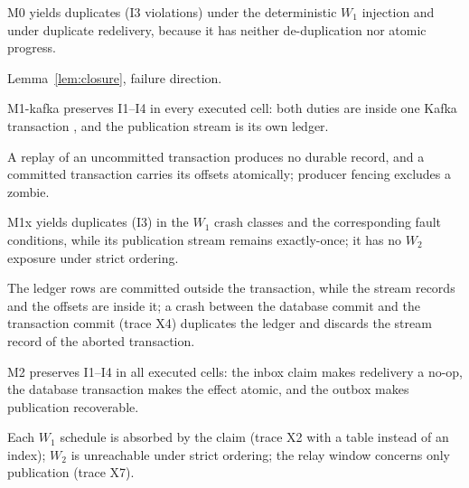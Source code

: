 \begin{proposition}
\label{prop:p4}
M0 yields duplicates (I3 violations) under the deterministic $W_1$ injection and under duplicate
redelivery, because it has neither de-duplication nor atomic progress.
\end{proposition}
\begin{proofsketch}
Lemma~\ref{lem:closure}, failure direction.
\end{proofsketch}

\begin{proposition}
\label{prop:p5}
M1-kafka preserves I1--I4 in every executed cell: both duties are inside one Kafka transaction
\cite{kip98}, and the publication stream is its own ledger.
\end{proposition}
\begin{proofsketch}
A replay of an uncommitted transaction produces no durable record, and a committed transaction
carries its offsets atomically; producer fencing excludes a zombie.
\end{proofsketch}

\begin{proposition}
\label{prop:p6}
M1x yields duplicates (I3) in the $W_1$ crash classes and the corresponding fault conditions,
while its publication stream remains exactly-once; it has no $W_2$ exposure under strict
ordering.
\end{proposition}
\begin{proofsketch}
The ledger rows are committed outside the transaction, while the stream records and the offsets
are inside it; a crash between the database commit and the transaction commit (trace X4)
duplicates the ledger and discards the stream record of the aborted transaction.
\end{proofsketch}

\begin{proposition}[M2 sufficiency]
\label{prop:p7}
M2 preserves I1--I4 in all executed cells: the inbox claim makes redelivery a no-op, the
database transaction makes the effect atomic, and the outbox makes publication recoverable.
\end{proposition}
\begin{proofsketch}
Each $W_1$ schedule is absorbed by the claim (trace X2 with a table instead of an index); $W_2$
is unreachable under strict ordering; the relay window concerns only publication (trace X7).
\end{proofsketch}

